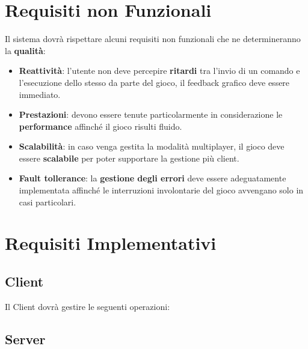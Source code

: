             
	\section{Requisiti non Funzionali}
        Il sistema dovrà rispettare alcuni requisiti non funzionali che ne determineranno la \textbf{qualità}:
        \begin{itemize}
            \item \textbf{Reattività}: l'utente non deve percepire \textbf{ritardi} tra l'invio di un comando e l'esecuzione dello stesso da parte del gioco, il feedback grafico deve essere immediato.
            
            \item \textbf{Prestazioni}: devono essere tenute particolarmente in considerazione le \textbf{performance} affinché il gioco risulti fluido.
            
            \item \textbf{Scalabilità}: in caso venga gestita la modalità multiplayer, il gioco deve essere \textbf{scalabile} per poter supportare la gestione più client.
            
            \item \textbf{Fault tollerance}: la \textbf{gestione degli errori} deve essere adeguatamente implementata affinché le interruzioni involontarie del gioco avvengano solo in casi particolari.
            

        \end{itemize}
	\section{Requisiti Implementativi}
	    \subsection{Client}
            Il Client dovrà gestire le seguenti operazioni:
        \subsection{Server}